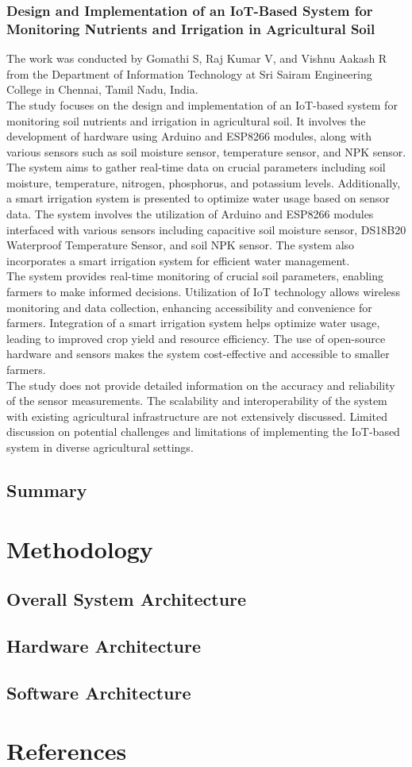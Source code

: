 \documentclass[12pt, a4paper]{article}
\begin{document}
\subsubsection{Design and Implementation of an IoT-Based System for Monitoring Nutrients and Irrigation in Agricultural Soil}
The work was conducted by Gomathi S, Raj Kumar V, and Vishnu Aakash R from the Department of Information Technology at Sri Sairam Engineering College in Chennai, Tamil Nadu, India.\\
The study focuses on the design and implementation of an IoT-based system for monitoring soil nutrients and irrigation in agricultural soil. It involves the development of hardware using Arduino and ESP8266 modules, along with various sensors such as soil moisture sensor, temperature sensor, and NPK sensor. The system aims to gather real-time data on crucial parameters including soil moisture, temperature, nitrogen, phosphorus, and potassium levels. Additionally, a smart irrigation system is presented to optimize water usage based on sensor data. The system involves the utilization of Arduino and ESP8266 modules interfaced with various sensors including capacitive soil moisture sensor, DS18B20 Waterproof Temperature Sensor, and soil NPK sensor. The system also incorporates a smart irrigation system for efficient water management.\\ The system provides real-time monitoring of crucial soil parameters, enabling farmers to make informed decisions. Utilization of IoT technology allows wireless monitoring and data collection, enhancing accessibility and convenience for farmers. Integration of a smart irrigation system helps optimize water usage, leading to improved crop yield and resource efficiency. The use of open-source hardware and sensors makes the system cost-effective and accessible to smaller farmers.\\
The study does not provide detailed information on the accuracy and reliability of the sensor measurements. The scalability and interoperability of the system with existing agricultural infrastructure are not extensively discussed. Limited discussion on potential challenges and limitations of implementing the IoT-based system in diverse agricultural settings.
\subsection{Summary}
\newpage

\section{Methodology}
\subsection{Overall System Architecture}
\subsection{Hardware Architecture}
\subsection{Software Architecture}
\newpage

\section{References}


\end{document}

